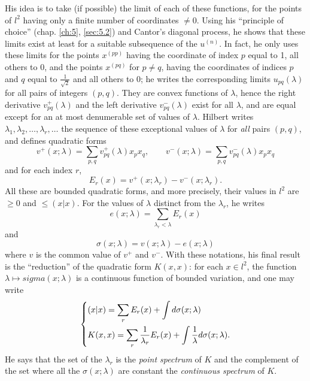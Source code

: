 \documentclass[12pt,a4paper,leqno,twoside]{extbook}
\begin{document}
His idea is to take (if possible) the limit of each of these functions, for the points of \(l^2\) having only a finite number of coordinates \(\neq 0\). Using his ``principle of choice'' (chap. \ref{ch:5}, \ref{sec:5.2}) and Cantor's diagonal process, he shows that these limits exist at least for a suitable subsequence of the \(u^{(n)}\). In fact, he only uses these limits for the points \(x^{(pp)}\) having the coordinate of index \(p\) equal to 1, all others to 0, and the points \(x^{(pq)}\) for \(p \neq q\), having the coordinates of indices \(p\) and \(q\) equal to \(\frac{1}{\sqrt{2}}\) and all others to 0; he writes the corresponding limits \(u_{pq}(\lambda)\) for all pairs of integers \((p,q)\). They are convex functions of \(\lambda\), hence the right derivative \(v^+_{pq}(\lambda)\) and the left derivative \(v^-_{pq}(\lambda)\) exist for all \(\lambda\), and are equal except for an at most denumerable set of values of \(\lambda\). Hilbert writes \(\lambda_1, \lambda_2, \ldots, \lambda_r, \ldots\) the sequence of these exceptional values of \(\lambda\) for \emph{all} pairs \((p,q)\), and defines quadratic forms
\[
    v^+(x; \lambda) = \sum_{p,q} v^+_{pq}(\lambda)x_p x_q, \qquad v^-(x; \lambda) = \sum_{p,q} v^-_{pq}(\lambda)x_p x_q
\]
and for each index \(r\),
\[
    E_r(x) = v^+(x; \lambda_r) - v^-(x; \lambda_r).
\]
All these are bounded quadratic forms, and more precisely, their values in \(l^2\) are \(\geq 0\) and \(\leq (x|x)\). For the values of \(\lambda\) distinct from the \(\lambda_r\), he writes
\[
    e(x; \lambda) = \sum_{\lambda_r < \lambda} E_r(x)
\]
and
\[
    \sigma(x; \lambda) = v(x; \lambda) - e(x; \lambda)
\]
where \(v\) is the common value of \(v^+\) and \(v^-\). With these notations, his final result is the ``reduction'' of the quadratic form \(K(x,x)\): for each \(x \in l^2\), the function \(\lambda \mapsto sigma(x; \lambda)\) is a continuous function of bounded variation, and one may write
\begin{equation}
    \label{eq:7.8}
    \begin{dcases}
        (x|x) = \sum_r E_r(x) + \int d\sigma(x; \lambda) \\
        K(x,x) = \sum_r \frac{1}{\lambda_r} E_r(x) + \int \frac{1}{\lambda} d\sigma(x; \lambda).
    \end{dcases}
\end{equation}
He says that the set of the \(\lambda_r\) is the \emph{point spectrum} of \(K\) and the complement of the set where all the \(\sigma(x; \lambda)\) are constant the \emph{continuous spectrum} of \(K\).
\end{document}
